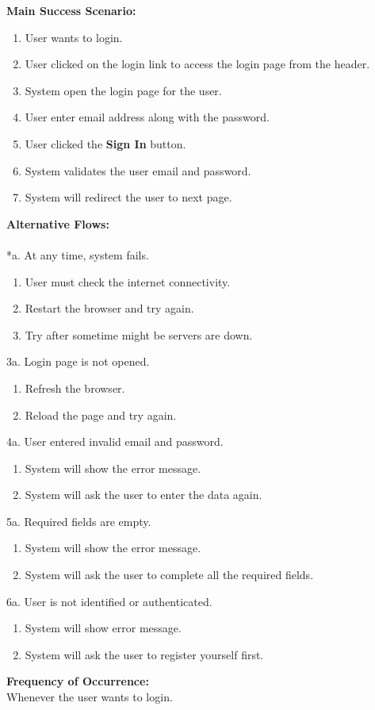 \textbf{Main Success Scenario:}
\begin{enumerate}
\item User wants to login.
\item User clicked on the login link to access the login page from the header.
\item System open the login page for the user.
\item User enter email address along with the password.
\item User clicked the \textbf{Sign In} button.
\item System validates the user email and password.
\item System will redirect the user to next page.
\end{enumerate}
\textbf{Alternative Flows:}\\
\\
*a. At any time, system fails.
\begin{enumerate}
\item User must check the internet connectivity.
\item Restart the browser and try again.
\item Try after sometime might be servers are down.
\end{enumerate}
3a. Login page is not opened.
\begin{enumerate}
\item Refresh the browser.
\item Reload the page and try again.
\end{enumerate}
4a. User entered invalid email and password.
\begin{enumerate}
\item System will show the error message.
\item System will ask the user to enter the data again.
\end{enumerate}
5a. Required fields are empty.
\begin{enumerate}
\item System will show the error message.
\item System will ask the user to complete all the required fields.
\end{enumerate}
6a. User is not identified or authenticated.
\begin{enumerate}
\item System will show error message.
\item System will ask the user to register yourself first.
\end{enumerate}
\textbf{Frequency of Occurrence:}\\
Whenever the user wants to login.





